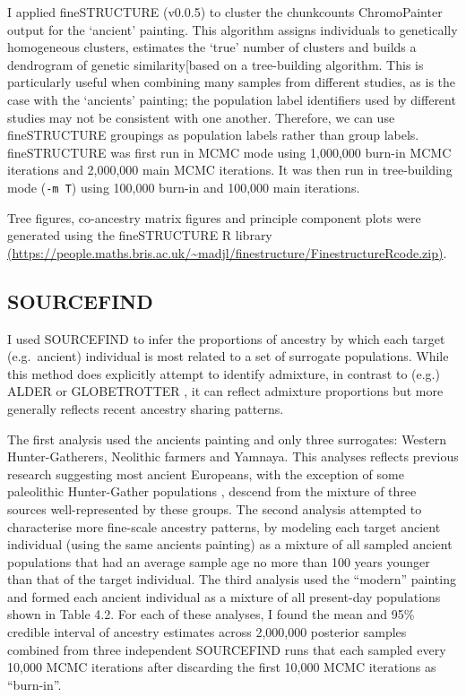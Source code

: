 I applied fineSTRUCTURE (v0.0.5)\cite{Lawson2012} to cluster the chunkcounts ChromoPainter output for the `ancient' painting. This algorithm assigns individuals to genetically homogeneous clusters, estimates the `true' number of clusters and builds a dendrogram of genetic similarity[based on a tree-building algorithm. This is particularly useful when combining many samples from different studies, as is the case with the `ancients' painting; the population label identifiers used by different studies may not be consistent with one another. Therefore, we can use fineSTRUCTURE groupings as population labels rather than group labels. fineSTRUCTURE was first run in MCMC mode using 1,000,000 burn-in MCMC iterations and 2,000,000 main MCMC iterations. It was then run in tree-building mode (\texttt{-m T}) using 100,000 burn-in and 100,000 main iterations. 

Tree figures, co-ancestry matrix figures and principle component plots were generated using the fineSTRUCTURE R library \url{(https://people.maths.bris.ac.uk/~madjl/finestructure/FinestructureRcode.zip)}.

\subsection{SOURCEFIND}

I used SOURCEFIND \cite{Chacon-Duque2018} to infer the proportions of ancestry by which each target (e.g.\ ancient) individual is most related to a set of surrogate populations. While this method does explicitly attempt to identify admixture, in contrast to (e.g.) ALDER \cite{LohAlderAdmixture} or GLOBETROTTER \cite{Hellenthal2014}, it can reflect admixture proportions \cite{Chacon-Duque2018} but more generally reflects recent ancestry sharing patterns.

The first analysis used the ancients painting and only three surrogates: Western Hunter-Gatherers, Neolithic farmers and Yamnaya. This analyses reflects previous research suggesting most ancient Europeans, with the exception of some paleolithic Hunter-Gather populations \cite{Fu2016}, descend from the mixture of three sources well-represented by these groups. The second analysis attempted to characterise more fine-scale ancestry patterns, by modeling each target ancient individual (using the same ancients painting) as a mixture of all sampled ancient populations that had an average sample age no more than 100 years younger than that of the target individual. The third analysis used the ``modern'' painting and formed each ancient individual as a mixture of all present-day populations shown in Table 4.2. For each of these analyses, I found the mean and 95\% credible interval of ancestry estimates across 2,000,000 posterior samples combined from three independent SOURCEFIND runs that each sampled every 10,000 MCMC iterations after discarding the first 10,000 MCMC iterations as ``burn-in''.


